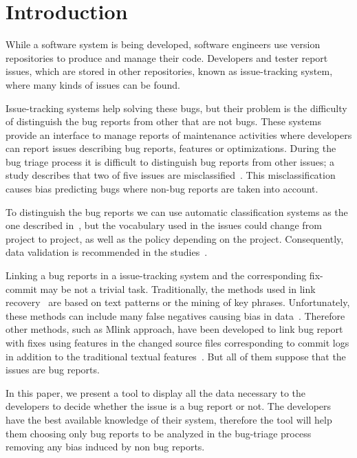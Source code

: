 \documentclass[ifip]{svmult}
\begin{document}
\section{Introduction}
\label{sec:1}


While a software system is being developed, software engineers use version repositories to produce and manage their code. Developers and tester report issues, which are stored in other repositories, known as issue-tracking system, where many kinds of issues can be found.

Issue-tracking systems help solving these bugs, but their problem is the difficulty of distinguish the bug reports from other that are not bugs. These systems provide an interface to manage reports of maintenance activities where developers can report issues describing bug reports, features or optimizations. During the bug triage process it is difficult to distinguish bug reports from other issues; a study describes that two of five issues are misclassified~\cite{Herzig}. This misclassification causes bias predicting bugs where non-bug reports are taken into account.

To distinguish the bug reports we can use automatic classification systems as the one described in~\cite{Antoniol}, but the vocabulary used in the issues could change from project to project, as well as the policy depending on the project. Consequently, data validation is recommended in the studies~\cite{Herzig}.

Linking a bug reports in a issue-tracking system and the corresponding fix-commit may be not a trivial task. Traditionally, the methods used in link recovery~\cite{Zimmermann, Thomas} are based on text patterns or the mining of key phrases. Unfortunately, these methods can include many false negatives causing bias in data~\cite{Bird, NguyenTH}. Therefore other methods, such as Mlink approach, have been developed to link bug report with fixes using features in the changed source files corresponding to commit logs in addition to the traditional textual features~\cite{Nguyen}. But all of them suppose that the issues are bug reports.

In this paper, we present a tool to display all the data necessary to the developers to decide whether the issue is a bug report or not. The developers have the best available knowledge of their system, therefore the tool will help them choosing only bug reports to be analyzed in the bug-triage process removing any bias induced by non bug reports.
\end{document}
